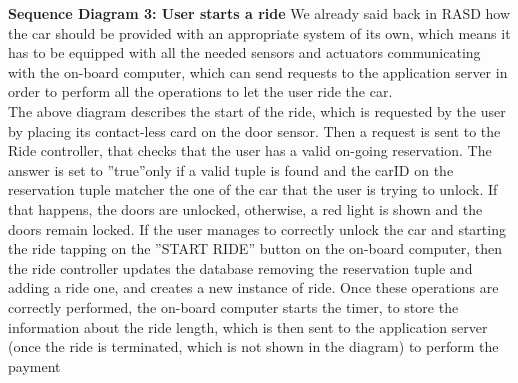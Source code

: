 \documentclass{article}
\begin{document}
\begin{flushleft}
\newpage
\textbf{Sequence Diagram 3: User starts a ride}
\break
We already said back in RASD how the car should be provided with an appropriate system of its own, which means it has to be equipped with all the needed sensors and actuators communicating with the on-board computer, which can send requests to the application server in order to perform all the operations to let the user ride the car.\\
The above diagram describes the start of the ride, which is requested by the user by placing its contact-less card on the door sensor. Then a request is sent to the Ride controller, that checks that the user has a valid on-going reservation. The answer is set to ''true''only if a valid tuple is found and the carID on the reservation tuple matcher the one of the car that the user is trying to unlock. If that happens, the doors are unlocked, otherwise, a red light is shown and the doors remain locked.
If the user manages to correctly unlock the car and starting the ride tapping on the ''START RIDE'' button on the on-board computer, then the ride controller updates the database removing the reservation tuple and adding a ride one, and creates a new instance of ride. Once these operations are correctly performed, the on-board computer starts the timer, to store the information about the ride length, which is then sent to the application server (once the ride is terminated, which is not shown in the diagram) to perform the payment 


\end{flushleft}
\end{document}
